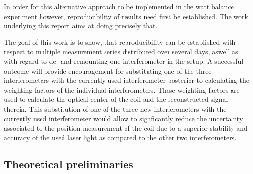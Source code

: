 \documentclass{report}
\numberwithin{tm}{section}
\begin{document}
In order for this alternative approach to be implemented in the watt balance experiment however, reproducibility of results need first be established. The work underlying this report aims at doing precisely that.

The goal of this work is to show, that reproducibility can be established with respect to multiple measurement series distributed over several days, aswell as with regard to de- and remounting one interferometer in the setup. A successful outcome will provide encouragement for substituting one of the three interferometers with the currently used interferometer posterior to calculating the weighting factors of the individual interferometers. These weighting factors are used to calculate the optical center of the coil and the reconstructed signal therein. This substitution of one of the three new interferometers with the currently used interferometer would allow to signficantly reduce the uncertainty associated to the position measurement of the coil due to a superior stability and accuracy of the used laser light as compared to the other two interferometers. %

\subsection{Theoretical preliminaries}
\end{document}

